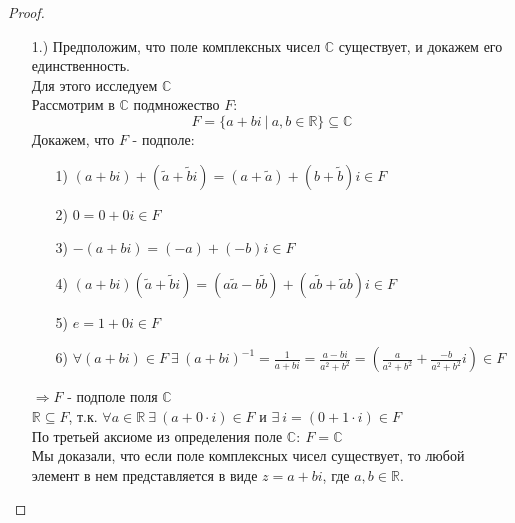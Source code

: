 \documentclass[a4paper, 12pt]{article}
\newcommand{\R}{\mathbb R}
\newcommand\tab[1][.5cm]{\hspace*{#1}}
\theoremstyle{definition}
\begin{document}
  \begin{proof}\tab
    \begin{itemize}
      \item[1.)]Предположим, что поле комплексных чисел $\mathbb{C}$ существует, и докажем его единственность. \\
      Для этого исследуем $\mathbb{C}$ \\
      Рассмотрим в $\mathbb{C}$ подмножество $F$: 
      $$F = \{a+bi \ | \ a,b \in \R\} \subseteq \mathbb{C}$$
      Докажем, что $F$ - подполе:
      \begin{itemize}
        \item[1)] $(a+bi) + (\widetilde{a}+\widetilde{b}i) = (a + \widetilde{a})+(b+\widetilde{b})i \in F$
        \item[2)] $0 = 0 + 0i \in F$
        \item[3)] $-(a+bi) = (-a) + (-b)i\in F$
        \item[4)] $(a+bi)(\widetilde{a}+\widetilde{b}i) = (a \widetilde{a}-b \widetilde{b}) + (a \widetilde{b}+ \widetilde{a} b)i \in F$
        \item[5)] $e = 1 + 0i \in F$
        \item[6)] $\forall (a+bi) \in F \ \exists \ (a+bi)^{-1} = \frac{1}{a+bi} = \frac{a-bi}{a^2+b^2} = (\frac{a}{a^2+b^2} + \frac{-b}{a^2+b^2}i) \in F$ 
      \end{itemize}
      $\Longrightarrow F$ - подполе поля $\mathbb{C}$ \\
      $\R \subseteq F$, т.к. $\forall a \in \R \ \exists \ (a + 0 \cdot i) \in F$ и $\exists \ i = (0 + 1 \cdot i) \in F$\\
      По третьей аксиоме из определения поле $\mathbb{C}: \ F=\mathbb{C}$\\
      Мы доказали, что если поле комплексных чисел существует, то любой элемент в нем представляется в виде $z = a + bi$, где $a, b \in \R$.\\

\end{itemize}
\end{proof}
\end{document}

